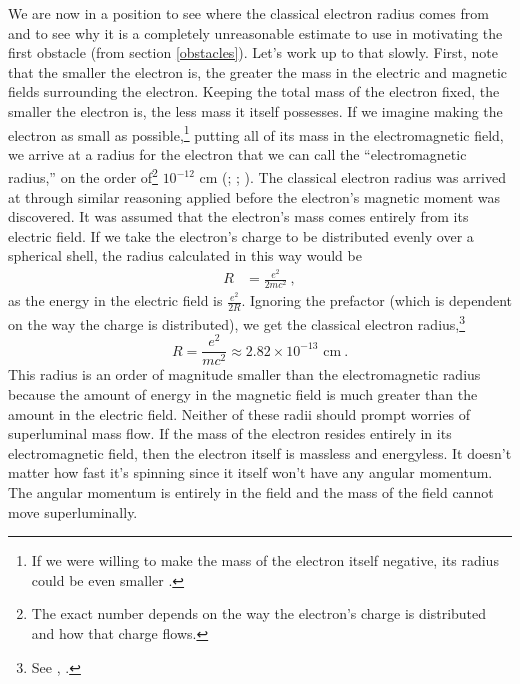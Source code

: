 \documentclass[12pt,secnumarabic,amsmath,amssymb,balancelastpage,nofootinbib]{article}
\begin{document}
We are now in a position to see where the classical electron radius comes from and to see why it is a completely unreasonable estimate to use in motivating the first obstacle (from section \ref{obstacles}).  Let's work up to that slowly.  First, note that the smaller the electron is, the greater the mass in the electric and magnetic fields surrounding the electron.  Keeping the total mass of the electron fixed, the smaller the electron is, the less mass it itself possesses.  If we imagine making the electron as small as possible,\footnote{If we were willing to make the mass of the electron itself negative, its radius could be even smaller \citep[pg.\ 214]{pearle}.} putting all of its mass in the electromagnetic field, we arrive at a radius for the electron that we can call the ``electromagnetic radius,'' on the order of\footnote{The exact number depends on the way the electron's charge is distributed and how that charge flows.} $10^{-12}$ cm (\citealp[pg.\ 47]{uhlenbeck}; \citealp[pg.\ 39]{pais1989}; \citealp[chapter 8]{macgregor}).  The classical electron radius was arrived at through similar reasoning applied before the electron's magnetic moment was discovered.  It was assumed that the electron's mass comes entirely from its electric field.  If we take the electron's charge to be distributed evenly over a spherical shell, the radius calculated in this way would be
\begin{align}
R&=\frac{e^2}{2 m c^2}\ ,
\label{electricsurfaceradius}
\end{align}
as the energy in the electric field is $\frac{e^2}{2 R}$.  Ignoring the prefactor (which is dependent on the way the charge is distributed), we get the classical electron radius,\footnote{See \citet[section 38-3]{feynman2}, \citet[section 6-1]{rohrlich}.}
\begin{equation}
R=\frac{e^2}{m c^2}\approx 2.82 \times 10^{-13} \mbox{ cm}\ .
\label{classicalelectronradius}
\end{equation}
This radius is an order of magnitude smaller than the electromagnetic radius because the amount of energy in the magnetic field is much greater than the amount in the electric field.  Neither of these radii should prompt worries of superluminal mass flow.  If the mass of the electron resides entirely in its electromagnetic field, then the electron itself is massless and energyless.  It doesn't matter how fast it's spinning since it itself won't have any angular momentum.  The angular momentum is entirely in the field and the mass of the field cannot move superluminally.
\end{document}
